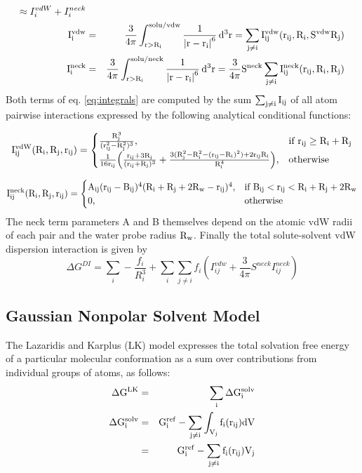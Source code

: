 \documentclass[12pt]{report}
\begin{document}
\begin{eqnarray}\label{eq:vdwneck}
    \approx  I_i^{vdW} + I_i^{neck} \nonumber \\ 
\rm I_i^{vdw} & = & \rm \frac{3}{4\pi}\int_{r>R_i}^{solu/vdw} \frac{1}{\left|r-r_i\right|^6} \,d^3r 
     = \sum_{j\not= i} I_{ij}^{vdw}(r_{ij},R_i,S^{vdw}R_j) \nonumber \\
\rm I_i^{neck} & = & \rm \frac{3}{4\pi}\int_{r>R_i}^{solu/neck} \frac{1}{\left|r-r_i\right|^6} \,d^3r 
    = \frac{3}{4\pi}S^{neck}\sum_{j\not= i} I_{ij}^{neck}(r_{ij},R_i,R_j)  
\end{eqnarray}
Both terms of eq. \ref{eq:integrals} are computed by the sum $\rm \sum_{j\not=i} I_{ij}$ of all atom pairwise interactions
expressed by the following analytical conditional functions: 

\begin{equation}\label{eq:vdwfun}
\rm    I_{ij}^{vdW}(R_i,R_j,r_{ij})= 
\begin{cases}
\rm    \frac{R_j^3}{(r_{ij}^2-R_j^2)^3},& \text{if } \rm r_{ij}\geq R_i + R_j\\
 \rm   \frac{1}{16r_{ij}}\Big(\frac{r_{ij}+3R_j}{(r_{ij}+R_j)^3} + \frac{3(R_j^2-R_i^2-(r_{ij}-R_i)^2)+2r_{ij}R_i}{R_i^4} \Big), 
   & \text{otherwise}
\end{cases}
\end{equation}

\begin{equation}\label{eq:neckfun}
\rm    I_{ij}^{neck}(R_i,R_j,r_{ij})= 
\begin{cases}
\rm   A_{ij}  (r_{ij}-B_{ij})^4(R_i + R_j + 2R_w - r_{ij})^4,& \text{if } \rm B_{ij} < r_{ij} < R_i + R_j + 2R_w \\
 \rm   0,              & \text{otherwise}
\end{cases}
\end{equation}
The neck term parameters A and B themselves depend on the atomic vdW radii of each pair and the water probe radius $\rm R_w$.
Finally the total solute-solvent vdW dispersion interaction is given by 
\begin{equation}
\Delta G^{DI} = \sum_i -\frac{f_i}{R_i^3} + \sum_i \sum_{j\not= i} f_i ( I_{ij}^{vdw}+ \frac{3}{4\pi}S^{neck}I_{ij}^{neck} )
\end{equation}

\subsection{Gaussian Nonpolar Solvent Model}
The Lazaridis and Karplus (LK) model \cite{Lazaridis99} expresses the total solvation free energy of a particular molecular
conformation as a sum over contributions from individual groups of atoms, as follows: 
\begin{eqnarray}\label{eq:lk}
\rm \Delta G^{LK}  & = & \rm \sum_i \Delta G^{solv}_i \nonumber \\
\rm \Delta G^{solv}_i  & = & \rm G_i^{ref} - \sum_{j\not= i} \int_{V_j} f_i(r_{ij}) dV \nonumber \\
 & = & \rm G_i^{ref} - \sum_{j\not= i} f_i(r_{ij}) V_j
\end{eqnarray} 
\end{document}
